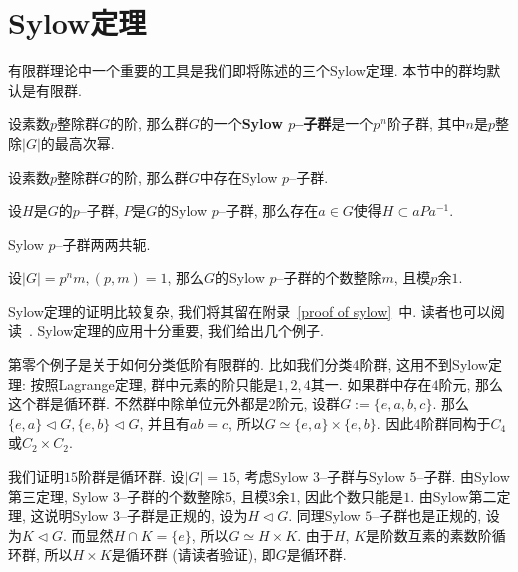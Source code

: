 \section{Sylow定理}

有限群理论中一个重要的工具是我们即将陈述的三个Sylow定理.
本节中的群均默认是有限群.
\begin{defn}
    设素数$p$整除群$G$的阶, 那么群$G$的一个\textbf{Sylow $p$--子群}是一个$p^n$阶子群, 其中$n$是$p$整除$|G|$的最高次幂.
\end{defn}

\begin{thm}[Sylow第一定理]
    设素数$p$整除群$G$的阶, 那么群$G$中存在Sylow $p$--子群.
\end{thm}

\begin{thm}[Sylow第二定理]
    设$H$是$G$的$p$--子群, $P$是$G$的Sylow $p$--子群, 那么存在$a\in G$使得$H\subset aPa^{-1}$.
\end{thm}

\begin{col}
    Sylow $p$--子群两两共轭.
\end{col}

\begin{thm}[Sylow第三定理]
    设$|G|=p^nm,(p,m)=1$, 那么$G$的Sylow $p$--子群的个数整除$m$, 且模$p$余$1$.
\end{thm}

Sylow定理的证明比较复杂, 我们将其留在附录~\ref{proof of sylow}~中.
读者也可以阅读~\parencite[pp.\ 33--36]{Lang}.
Sylow定理的应用十分重要, 我们给出几个例子.

\begin{eg}
    第零个例子是关于如何分类低阶有限群的.
    比如我们分类$4$阶群, 这用不到Sylow定理:
    按照Lagrange定理, 群中元素的阶只能是$1,2,4$其一.
    如果群中存在$4$阶元, 那么这个群是循环群.
    不然群中除单位元外都是$2$阶元, 设群$G:=\{e,a,b,c\}$.
    那么$\{e,a\}\lhd G,\{e,b\}\lhd G$, 并且有$ab=c$, 所以$G\simeq\{e,a\}\times\{e,b\}$.
    因此$4$阶群同构于$C_4$或$C_2\times C_2$.
\end{eg}

\begin{eg}
    我们证明$15$阶群是循环群.
    设$|G|=15$, 考虑Sylow $3$--子群与Sylow $5$--子群.
    由Sylow第三定理, Sylow $3$--子群的个数整除$5$, 且模$3$余$1$, 因此个数只能是$1$.
    由Sylow第二定理, 这说明Sylow $3$--子群是正规的, 设为$H\lhd G$.
    同理Sylow $5$--子群也是正规的, 设为$K\lhd G$.
    而显然$H\cap K=\{e\}$, 所以$G\simeq H\times K$.
    由于$H$, $K$是阶数互素的素数阶循环群, 所以$H\times K$是循环群 (请读者验证), 即$G$是循环群.
\end{eg}

